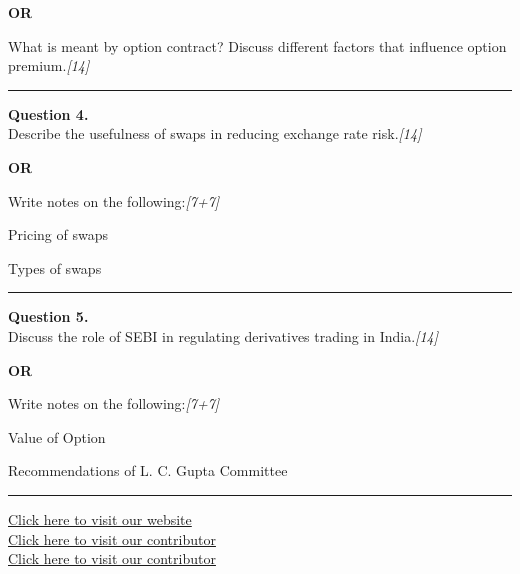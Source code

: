 \documentclass[11pt,a4paper]{article}
\newcommand{\pts}[1]{\hfill   \textit{[#1]}}
\begin{document}
\centerline{   \textbf{OR}}

What is meant by option contract? Discuss different factors that influence option premium.\pts{14}

\medskip\rule{\linewidth}{0.2pt}




\noindent   \textbf{Question 4.} \\
Describe the usefulness of swaps in reducing exchange rate risk.\pts{14}

\centerline{   \textbf{OR}}

Write notes on the following:\pts{7+7}

\begin{parts}
  \item Pricing of swaps
  \item Types of swaps
\end{parts}

\medskip\rule{\linewidth}{0.2pt}




\noindent   \textbf{Question 5.} \\
Discuss the role of SEBI in regulating derivatives trading in India.\pts{14}

\centerline{   \textbf{OR}}

Write notes on the following:\pts{7+7}

\begin{parts}
  \item Value of Option
  \item Recommendations of L. C. Gupta Committee
\end{parts}

\vfill
\rule{\linewidth}{0.4pt}

\begin{center}\small
\href{https://bhu-exam.vercel.app/}{Click here to visit our website}\\[4pt]
\href{https://me-aryan.vercel.app/}{Click here to visit our contributor}\\[4pt]
\href{https://quashan-me.vercel.app/}{Click here to visit our contributor}
\end{center}
\end{document}
